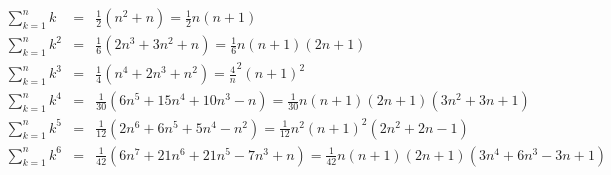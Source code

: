 \begin{eqnarray*}
	\sum_{k=1}^n k &=& \frac12 (n^2 + n) = \frac12 n(n+1) \\
	\sum_{k=1}^n k^2 &=& \frac16 (2n^3+3n^2+n) = \frac16 n(n+1)(2n+1) \\
	\sum_{k=1}^n k^3 &=& \frac14 (n^4+2n^3+n^2) = \frac4 n^2(n+1)^2 \\
	\sum_{k=1}^n k^4 &=& \frac1{30} (6n^5+15n^4+10n^3-n) = \frac1{30} n(n+1)(2n+1)(3n^2+3n+1) \\
	\sum_{k=1}^n k^5 &=& \frac1{12} (2n^6+6n^5+5n^4-n^2) = \frac1{12} n^2(n+1)^2(2n^2+2n-1) \\
	\sum_{k=1}^n k^6 &=& \frac1{42} (6n^7+21n^6+21n^5-7n^3+n) = \frac1{42} n(n+1)(2n+1)(3n^4+6n^3-3n+1)
\end{eqnarray*}
